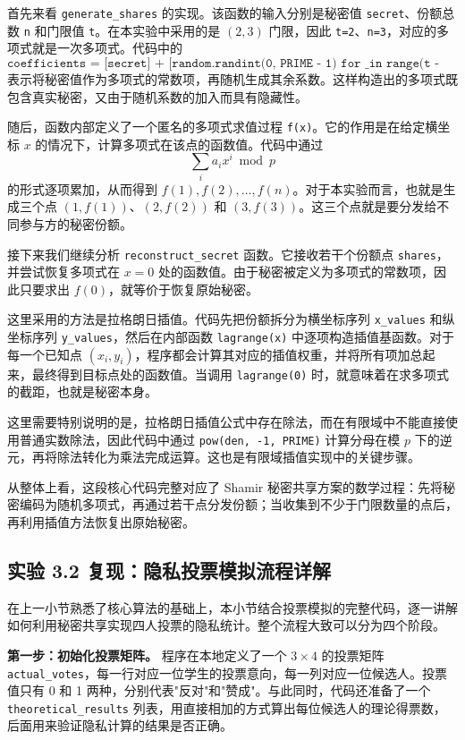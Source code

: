 \documentclass[a4paper]{article}
\begin{document}
首先来看 \texttt{generate\_shares} 的实现。该函数的输入分别是秘密值 \texttt{secret}、份额总数 \texttt{n} 和门限值 \texttt{t}。在本实验中采用的是 $(2,3)$ 门限，因此 \texttt{t=2}、\texttt{n=3}，对应的多项式就是一次多项式。代码中的
\[
\texttt{coefficients = [secret] + [random.randint(0, PRIME - 1) for \_ in range(t - 1)]}
\]
表示将秘密值作为多项式的常数项，再随机生成其余系数。这样构造出的多项式既包含真实秘密，又由于随机系数的加入而具有隐藏性。

随后，函数内部定义了一个匿名的多项式求值过程 \texttt{f(x)}。它的作用是在给定横坐标 $x$ 的情况下，计算多项式在该点的函数值。代码中通过
\[
\sum_i a_i x^i \bmod p
\]
的形式逐项累加，从而得到 $f(1), f(2), \dots, f(n)$。对于本实验而言，也就是生成三个点 $(1,f(1))$、$(2,f(2))$ 和 $(3,f(3))$。这三个点就是要分发给不同参与方的秘密份额。

接下来我们继续分析 \texttt{reconstruct\_secret} 函数。它接收若干个份额点 \texttt{shares}，并尝试恢复多项式在 $x=0$ 处的函数值。由于秘密被定义为多项式的常数项，因此只要求出 $f(0)$，就等价于恢复原始秘密。

这里采用的方法是拉格朗日插值。代码先把份额拆分为横坐标序列 \texttt{x\_values} 和纵坐标序列 \texttt{y\_values}，然后在内部函数 \texttt{lagrange(x)} 中逐项构造插值基函数。对于每一个已知点 $(x_i, y_i)$，程序都会计算其对应的插值权重，并将所有项加总起来，最终得到目标点处的函数值。当调用 \texttt{lagrange(0)} 时，就意味着在求多项式的截距，也就是秘密本身。

这里需要特别说明的是，拉格朗日插值公式中存在除法，而在有限域中不能直接使用普通实数除法，因此代码中通过 \texttt{pow(den, -1, PRIME)} 计算分母在模 $p$ 下的逆元，再将除法转化为乘法完成运算。这也是有限域插值实现中的关键步骤。

从整体上看，这段核心代码完整对应了 Shamir 秘密共享方案的数学过程：先将秘密编码为随机多项式，再通过若干点分发份额；当收集到不少于门限数量的点后，再利用插值方法恢复出原始秘密。

\subsection{实验 3.2 复现：隐私投票模拟流程详解}
在上一小节熟悉了核心算法的基础上，本小节结合投票模拟的完整代码，逐一讲解如何利用秘密共享实现四人投票的隐私统计。整个流程大致可以分为四个阶段。

\textbf{第一步：初始化投票矩阵。} 程序在本地定义了一个 $3 \times 4$ 的投票矩阵 \texttt{actual\_votes}，每一行对应一位学生的投票意向，每一列对应一位候选人。投票值只有 0 和 1 两种，分别代表"反对"和"赞成"。与此同时，代码还准备了一个 \texttt{theoretical\_results} 列表，用直接相加的方式算出每位候选人的理论得票数，后面用来验证隐私计算的结果是否正确。
\end{document}
